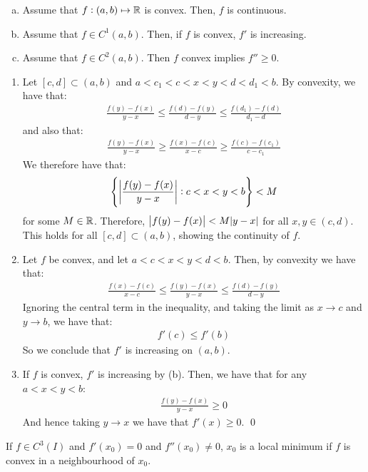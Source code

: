 \begin{ntheorem}{}{}
    \begin{enumerate}[(a)]
        \item Assume that $f: (a, b) \mapsto \mathbb{R}$ is convex. Then, $f$ is continuous.
        \item Assume that $f \in C^1(a, b)$. Then, if $f$ is convex, $f'$ is increasing.
        \item Assume that $f \in C^2(a, b)$. Then $f$ convex implies $f'' \geq 0$. 
    \end{enumerate}
\end{ntheorem}
\begin{nproof}
    \begin{enumerate}
        \item Let $[c, d] \subset (a, b)$ and $a < c_1 < c < x < y < d < d_1 < b$. By convexity, we have that:
        \begin{align*}
            \frac{f(y) - f(x)}{y - x} \leq \frac{f(d) - f(y)}{d - y} \leq \frac{f(d_1) - f(d)}{d_1 - d}
        \end{align*}
        and also that:
        \begin{align*}
            \frac{f(y) - f(x)}{y - x} \geq \frac{f(x) - f(c)}{x - c} \geq \frac{f(c) - f(c_1)}{c - c_1}
        \end{align*}
        We therefore have that:
        \begin{align*}
            \set{\abs{\frac{f(y) - f(x)}{y - x}}: c < x < y < b} < M
        \end{align*}
        for some $M \in \mathbb{R}$. Therefore, $\abs{f(y) - f(x)} < M\abs{y - x}$ for all $x, y \in (c, d)$. This holds for all $[c, d] \subset (a, b)$, showing the continuity of $f$.
        \item Let $f$ be convex, and let $a < c < x < y < d < b$. Then, by convexity we have that:
        \begin{align*}
            \frac{f(x) - f(c)}{x - c} \leq \frac{f(y) - f(x)}{y - x} \leq \frac{f(d) - f(y)}{d - y}
        \end{align*}
        Ignoring the central term in the inequality, and taking the limit as $x \rightarrow c$ and $ y \rightarrow b$, we have that:
        \begin{align*}
            f'(c) \leq f'(b)
        \end{align*}
        So we conclude that $f'$ is increasing on $(a, b)$. 
        \item If $f$ is convex, $f'$ is increasing by (b). Then, we have that for any $a < x < y < b$:
        \begin{align*}
            \frac{f(y) - f(x)}{y - x} \geq 0
        \end{align*}
        And hence taking $y \rightarrow x$ we have that $f'(x) \geq 0$. \qed
    \end{enumerate}
\end{nproof}

\begin{ncorollary}{}{}
    If $f \in C^3(I)$ and $f'(x_0) = 0$ and $f''(x_0) \neq 0$, $x_0$ is a local minimum if $f$ is convex in a neighbourhood of $x_0$. 
\end{ncorollary}